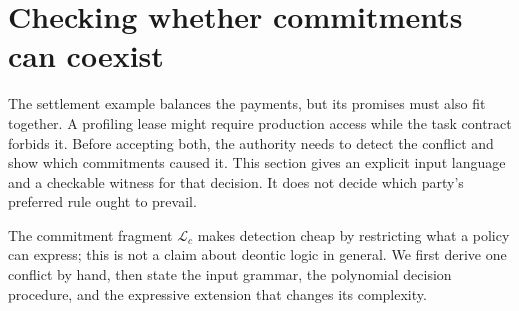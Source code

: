 \documentclass[11pt,a4paper]{article}
\theoremstyle{definition}
\theoremstyle{definition}
\theoremstyle{remark}
\begin{document}
\pdexercisepointer{\ref{ex:he-grossman-hart-roles}}{\ref{ex:he-portfolio-version-binding}}{\pageref{ex:he-grossman-hart-roles}}


\section{Checking whether commitments can coexist}\label{sec:deontic-decision}

The settlement example balances the payments, but its promises must also fit
together. A profiling lease might require production access while the task
contract forbids it. Before accepting both, the authority needs to detect the
conflict and show which commitments caused it. This section gives an explicit
input language and a checkable witness for that decision. It does not decide
which party's preferred rule ought to prevail.

The commitment fragment $\mathcal{L}_c$ makes detection cheap by restricting
what a policy can express; this is not a claim about deontic logic in general.
We first derive one conflict by hand, then state the input grammar, the
polynomial decision procedure, and the expressive extension that changes
its complexity.
\end{document}
